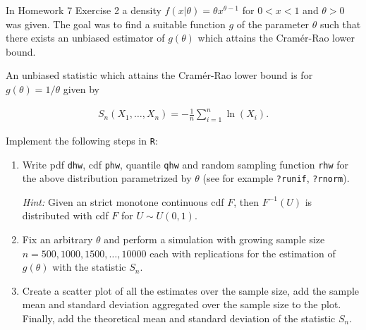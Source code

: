 
\begin{exercise}

In Homework 7 Exercise 2 a density $f(x|\theta) = \theta x^{\theta - 1}$
for $0 < x < 1$ and $\theta > 0$ was given. The goal was to find a suitable
function $g$ of the parameter $\theta$ such that there exists an unbiased
estimator of $g(\theta)$ which attains the Cramér-Rao lower bound.

An unbiased statistic which attains the Cramér-Rao lower bound is for
$g(\theta) = 1/\theta$ given by

\begin{align*}
  S_n(X_1,\dots,X_n) = - \frac{1}{n}\sum_{i=1}^n \ln(X_i).
\end{align*}

Implement the following steps in \texttt{R}:

\begin{enumerate}[label = (\alph*)]
  \item Write pdf \texttt{dhw}, cdf \texttt{phw}, quantile \texttt{qhw}
  and random sampling function \texttt{rhw} for the above distribution
  parametrized by $\theta$ (see for example \texttt{?runif}, \texttt{?rnorm}).

  \textit{Hint:} Given an strict monotone continuous cdf $F$, then $F^{-1}(U)$
  is distributed with cdf $F$ for $U \sim U(0,1)$.

  \item Fix an arbitrary $\theta$ and perform a simulation with growing
  sample size $n = 500, 1000, 1500, \dots, 10000$ each with replications
  for the estimation of $g(\theta)$ with the statistic $S_n$.
  
  \item Create a scatter plot of all the estimates over the sample size,
  add the sample mean and standard deviation aggregated over
  the sample size to the plot. Finally, add the theoretical mean and
  standard deviation of the statistic $S_n$.
\end{enumerate}

\end{exercise}



